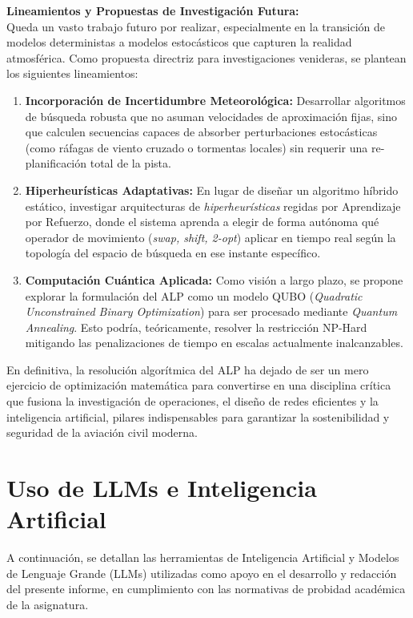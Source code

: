 \documentclass[letter, 10pt]{article}
\begin{document}
\textbf{Lineamientos y Propuestas de Investigaci\'on Futura:}\\
Queda un vasto trabajo futuro por realizar, especialmente en la transici\'on de modelos deterministas a modelos estoc\'asticos que capturen la realidad atmosf\'erica. Como propuesta directriz para investigaciones venideras, se plantean los siguientes lineamientos:
\begin{enumerate}
    \item \textbf{Incorporaci\'on de Incertidumbre Meteorol\'ogica:} Desarrollar algoritmos de b\'usqueda robusta que no asuman velocidades de aproximaci\'on fijas, sino que calculen secuencias capaces de absorber perturbaciones estoc\'asticas (como r\'afagas de viento cruzado o tormentas locales) sin requerir una re-planificaci\'on total de la pista.
    \item \textbf{Hiperheur\'isticas Adaptativas:} En lugar de dise\~nar un algoritmo h\'ibrido est\'atico, investigar arquitecturas de \textit{hiperheur\'isticas} regidas por Aprendizaje por Refuerzo, donde el sistema aprenda a elegir de forma aut\'onoma qu\'e operador de movimiento (\textit{swap, shift, 2-opt}) aplicar en tiempo real seg\'un la topolog\'ia del espacio de b\'usqueda en ese instante espec\'ifico.
    \item \textbf{Computaci\'on Cu\'antica Aplicada:} Como visi\'on a largo plazo, se propone explorar la formulaci\'on del ALP como un modelo QUBO (\textit{Quadratic Unconstrained Binary Optimization}) para ser procesado mediante \textit{Quantum Annealing}. Esto podr\'ia, te\'oricamente, resolver la restricci\'on NP-Hard mitigando las penalizaciones de tiempo en escalas actualmente inalcanzables.
\end{enumerate}

En definitiva, la resoluci\'on algor\'itmica del ALP ha dejado de ser un mero ejercicio de optimizaci\'on matem\'atica para convertirse en una disciplina cr\'itica que fusiona la investigaci\'on de operaciones, el dise\~no de redes eficientes y la inteligencia artificial, pilares indispensables para garantizar la sostenibilidad y seguridad de la aviaci\'on civil moderna.

\section{Uso de LLMs e Inteligencia Artificial}
A continuaci\'on, se detallan las herramientas de Inteligencia Artificial y Modelos de Lenguaje Grande (LLMs) utilizadas como apoyo en el desarrollo y redacci\'on del presente informe, en cumplimiento con las normativas de probidad acad\'emica de la asignatura.
\end{document}
